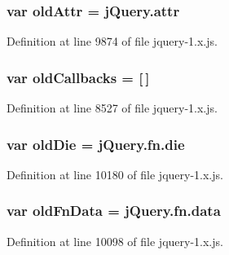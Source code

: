\subsubsection[{\texorpdfstring{old\+Attr}{oldAttr}}]{\setlength{\rightskip}{0pt plus 5cm}var old\+Attr = {\bf j\+Query.\+attr}}\hypertarget{jquery-1_8x_8js_a5fe62d7b5a67ce31d71235b0d94b9309}{}\label{jquery-1_8x_8js_a5fe62d7b5a67ce31d71235b0d94b9309}


Definition at line 9874 of file jquery-\/1.\+x.\+js.

\subsubsection[{\texorpdfstring{old\+Callbacks}{oldCallbacks}}]{\setlength{\rightskip}{0pt plus 5cm}var old\+Callbacks = \mbox{[}$\,$\mbox{]}}\hypertarget{jquery-1_8x_8js_ae46a2ee65a3f347972462f869c9d4960}{}\label{jquery-1_8x_8js_ae46a2ee65a3f347972462f869c9d4960}


Definition at line 8527 of file jquery-\/1.\+x.\+js.

\subsubsection[{\texorpdfstring{old\+Die}{oldDie}}]{\setlength{\rightskip}{0pt plus 5cm}var old\+Die = {\bf j\+Query.\+fn.\+die}}\hypertarget{jquery-1_8x_8js_ad09378af6cf85e4cbf81905ae728d664}{}\label{jquery-1_8x_8js_ad09378af6cf85e4cbf81905ae728d664}


Definition at line 10180 of file jquery-\/1.\+x.\+js.

\subsubsection[{\texorpdfstring{old\+Fn\+Data}{oldFnData}}]{\setlength{\rightskip}{0pt plus 5cm}var old\+Fn\+Data = {\bf j\+Query.\+fn.\+data}}\hypertarget{jquery-1_8x_8js_abedd13ca7b5e331c7c0781cd2be12bda}{}\label{jquery-1_8x_8js_abedd13ca7b5e331c7c0781cd2be12bda}


Definition at line 10098 of file jquery-\/1.\+x.\+js.

